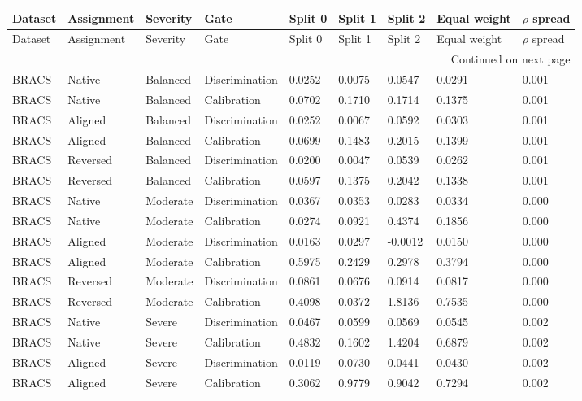 \begin{longtable}{lllllllll}
\toprule
Dataset & Assignment & Severity & Gate & Split 0 & Split 1 & Split 2 & Equal weight & $\rho$ spread \\
\midrule
\endfirsthead
\toprule
Dataset & Assignment & Severity & Gate & Split 0 & Split 1 & Split 2 & Equal weight & $\rho$ spread \\
\midrule
\endhead
\midrule
\multicolumn{9}{r}{Continued on next page} \\
\midrule
\endfoot
\bottomrule
\endlastfoot
BRACS & Native & Balanced & Discrimination & 0.0252 & 0.0075 & 0.0547 & 0.0291 & 0.001 \\
BRACS & Native & Balanced & Calibration & 0.0702 & 0.1710 & 0.1714 & 0.1375 & 0.001 \\
BRACS & Aligned & Balanced & Discrimination & 0.0252 & 0.0067 & 0.0592 & 0.0303 & 0.001 \\
BRACS & Aligned & Balanced & Calibration & 0.0699 & 0.1483 & 0.2015 & 0.1399 & 0.001 \\
BRACS & Reversed & Balanced & Discrimination & 0.0200 & 0.0047 & 0.0539 & 0.0262 & 0.001 \\
BRACS & Reversed & Balanced & Calibration & 0.0597 & 0.1375 & 0.2042 & 0.1338 & 0.001 \\
BRACS & Native & Moderate & Discrimination & 0.0367 & 0.0353 & 0.0283 & 0.0334 & 0.000 \\
BRACS & Native & Moderate & Calibration & 0.0274 & 0.0921 & 0.4374 & 0.1856 & 0.000 \\
BRACS & Aligned & Moderate & Discrimination & 0.0163 & 0.0297 & -0.0012 & 0.0150 & 0.000 \\
BRACS & Aligned & Moderate & Calibration & 0.5975 & 0.2429 & 0.2978 & 0.3794 & 0.000 \\
BRACS & Reversed & Moderate & Discrimination & 0.0861 & 0.0676 & 0.0914 & 0.0817 & 0.000 \\
BRACS & Reversed & Moderate & Calibration & 0.4098 & 0.0372 & 1.8136 & 0.7535 & 0.000 \\
BRACS & Native & Severe & Discrimination & 0.0467 & 0.0599 & 0.0569 & 0.0545 & 0.002 \\
BRACS & Native & Severe & Calibration & 0.4832 & 0.1602 & 1.4204 & 0.6879 & 0.002 \\
BRACS & Aligned & Severe & Discrimination & 0.0119 & 0.0730 & 0.0441 & 0.0430 & 0.002 \\
BRACS & Aligned & Severe & Calibration & 0.3062 & 0.9779 & 0.9042 & 0.7294 & 0.002 \\

\end{longtable}
